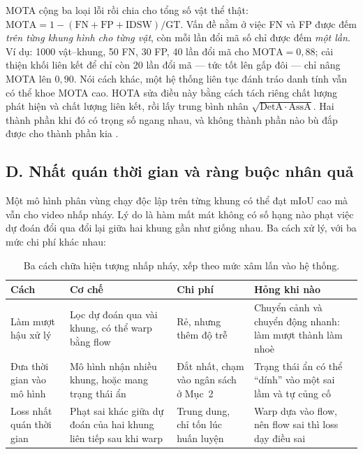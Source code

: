\documentclass[../../../deep_learning.tex]{subfiles}
\begin{document}
\begin{cambay}
MOTA cộng ba loại lỗi rồi chia cho tổng số vật thể thật: \(\mathrm{MOTA} = 1 - (\mathrm{FN}+\mathrm{FP}+\mathrm{IDSW})/\mathrm{GT}\). Vấn đề nằm ở việc FN và FP được đếm \emph{trên từng khung hình cho từng vật}, còn mỗi lần đổi mã số chỉ được đếm \emph{một lần}. Ví dụ: 1000 vật--khung, 50 FN, 30 FP, 40 lần đổi mã cho \(\mathrm{MOTA}=0{,}88\); cải thiện khối liên kết để chỉ còn 20 lần đổi mã --- tức tốt lên gấp đôi --- chỉ nâng MOTA lên \(0{,}90\). Nói cách khác, một hệ thống liên tục đánh tráo danh tính vẫn có thể khoe MOTA cao. HOTA sửa điều này bằng cách tách riêng chất lượng phát hiện và chất lượng liên kết, rồi lấy trung bình nhân \(\sqrt{\mathrm{DetA}\cdot\mathrm{AssA}}\). Hai thành phần khi đó có trọng số ngang nhau, và không thành phần nào bù đắp được cho thành phần kia \cite{luiten2021hota, bernardin2008clear}.
\end{cambay}

\subsection{D. Nhất quán thời gian và ràng buộc nhân quả}
Một mô hình phân vùng chạy độc lập trên từng khung có thể đạt mIoU cao mà vẫn cho video nhấp nháy. Lý do là hàm mất mát không có số hạng nào phạt việc dự đoán đổi qua đổi lại giữa hai khung gần như giống nhau. Ba cách xử lý, với ba mức chi phí khác nhau:

\begin{table}[H]\centering\small
\caption{Ba cách chữa hiện tượng nhấp nháy, xếp theo mức xâm lấn vào hệ thống.}
\label{tab:temporal-consistency}
\begin{tabularx}{\linewidth}{@{}L{2.6cm}YL{2.4cm}L{3.4cm}@{}}
\toprule
\textbf{Cách} & \textbf{Cơ chế} & \textbf{Chi phí} & \textbf{Hỏng khi nào}\\
\midrule
Làm mượt hậu xử lý & Lọc dự đoán qua vài khung, có thể warp bằng flow & Rẻ, nhưng thêm độ trễ & Chuyển cảnh và chuyển động nhanh: làm mượt thành làm nhoè\\
Đưa thời gian vào mô hình & Mô hình nhận nhiều khung, hoặc mang trạng thái ẩn & Đắt nhất, chạm vào ngân sách ở Mục~2 & Trạng thái ẩn có thể ``dính'' vào một sai lầm và tự củng cố\\
Loss nhất quán thời gian & Phạt sai khác giữa dự đoán của hai khung liên tiếp sau khi warp & Trung dung, chỉ tốn lúc huấn luyện & Warp dựa vào flow, nên flow sai thì loss dạy điều sai\\
\bottomrule
\end{tabularx}
\end{table}
\end{document}
